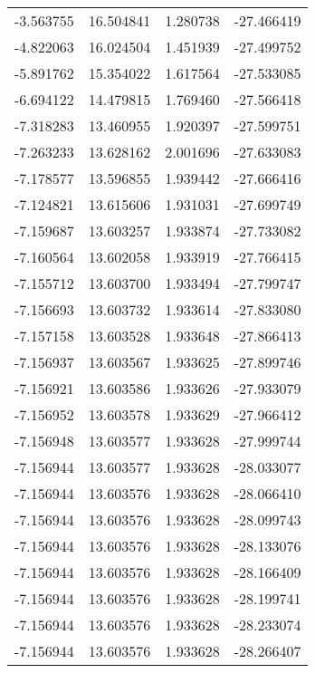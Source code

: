 \begin{tabular}{rrrr}
       -3.563755 &        16.504841 &    1.280738 & -27.466419 \\
       -4.822063 &        16.024504 &    1.451939 & -27.499752 \\
       -5.891762 &        15.354022 &    1.617564 & -27.533085 \\
       -6.694122 &        14.479815 &    1.769460 & -27.566418 \\
       -7.318283 &        13.460955 &    1.920397 & -27.599751 \\
       -7.263233 &        13.628162 &    2.001696 & -27.633083 \\
       -7.178577 &        13.596855 &    1.939442 & -27.666416 \\
       -7.124821 &        13.615606 &    1.931031 & -27.699749 \\
       -7.159687 &        13.603257 &    1.933874 & -27.733082 \\
       -7.160564 &        13.602058 &    1.933919 & -27.766415 \\
       -7.155712 &        13.603700 &    1.933494 & -27.799747 \\
       -7.156693 &        13.603732 &    1.933614 & -27.833080 \\
       -7.157158 &        13.603528 &    1.933648 & -27.866413 \\
       -7.156937 &        13.603567 &    1.933625 & -27.899746 \\
       -7.156921 &        13.603586 &    1.933626 & -27.933079 \\
       -7.156952 &        13.603578 &    1.933629 & -27.966412 \\
       -7.156948 &        13.603577 &    1.933628 & -27.999744 \\
       -7.156944 &        13.603577 &    1.933628 & -28.033077 \\
       -7.156944 &        13.603576 &    1.933628 & -28.066410 \\
       -7.156944 &        13.603576 &    1.933628 & -28.099743 \\
       -7.156944 &        13.603576 &    1.933628 & -28.133076 \\
       -7.156944 &        13.603576 &    1.933628 & -28.166409 \\
       -7.156944 &        13.603576 &    1.933628 & -28.199741 \\
       -7.156944 &        13.603576 &    1.933628 & -28.233074 \\
       -7.156944 &        13.603576 &    1.933628 & -28.266407 \\

\end{tabular}
